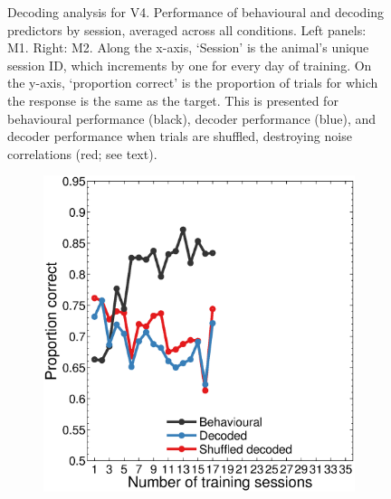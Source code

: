 \begin{figure}[htbp]
\begin{subfigure}[b]{0.5\linewidth}
    \end{subfigure}
    \caption{%
    Decoding analysis for \ac{V4}.
    Performance of behavioural and decoding predictors by session, averaged across all conditions.
    Left panels: \ac{M1}. Right: \ac{M2}.
	Along the x-axis, `Session' is the animal's unique session ID, which increments by one for every day of training.
    On the y-axis, `proportion correct' is the proportion of trials for which the response is the same as the target.
    This is presented for behavioural performance (black), decoder performance (blue), and decoder performance when trials are shuffled, destroying noise correlations (red; see text).
}
    \label{fig:dec_all_v4}
\end{figure}

\begin{figure}[htbp]
    \begin{subfigure}[b]{0.5\linewidth}
        \centering
        \caption{}
        \label{fig:dec_b1_allp}
	\includegraphics[width=\linewidth]{figs/decoding/perf_v1_blanco.eps}
    \end{subfigure}
    ~~
    \begin{subfigure}[b]{0.5\linewidth}
        \centering
        \caption{}
        \label{fig:dec_j1_allp}

\end{subfigure}
\end{figure}
